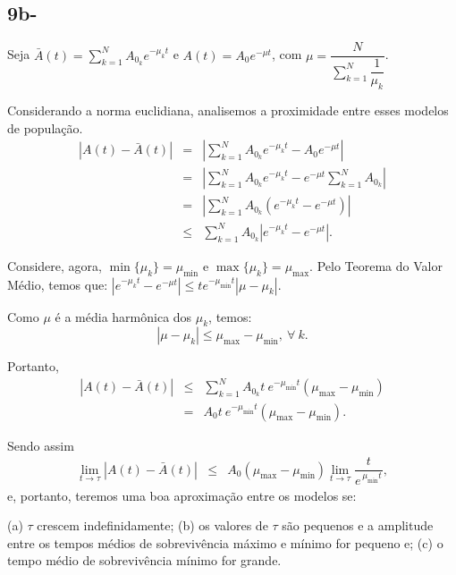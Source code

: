 {\subsection*{9b-}

Seja \(\bar{A}(t) = \displaystyle\sum_{k=1}^{N} A_{0_{k}} e^{-\mu_k t}\) e \(A(t) = A_{0} e^{-\mu t}\), com \(\mu = \dfrac{N}{\displaystyle\sum_{k=1}^{N} \dfrac{1}{\mu_k}}\).

Considerando a norma euclidiana, analisemos a proximidade entre esses modelos de população.
\[\begin{array}{rcl}
\left|A(t)-\bar{A}(t)\right|
&=& \left|\displaystyle\sum_{k=1}^{N} A_{0_{k}} e^{-\mu_k t}-A_{0} e^{-\mu t}\right| \\
&=& \left|\displaystyle\sum_{k=1}^{N} A_{0_{k}} e^{-\mu_k t}-e^{-\mu t} \sum_{k=1}^{N} A_{0_{k}} \right| \\
&=& \left|\displaystyle\sum_{k=1}^{N} A_{0_{k}} (e^{-\mu_k t}-e^{-\mu t}) \right| \\
&\le& \displaystyle\sum_{k=1}^{N} A_{0_{k}} \left|e^{-\mu_k t}-e^{-\mu t}\right|.
\end{array}\]

Considere, agora, \(\min\{\mu_k\} = \mu_{\min}\) e \(\max\{\mu_k\} = \mu_{\max}\). Pelo Teorema do Valor Médio, temos que:
\(\left|e^{-\mu_k t}-e^{-\mu t}\right| \le t e^{-\mu_{\min} t} |\mu -\mu_k|.\)

Como \(\mu\) é a média harmônica dos \(\mu_k\), temos:
\[
|\mu -\mu_k| \le \mu_{\max} - \mu_{\min},\ \forall\ k.
\]

Portanto,
\[\begin{array}{rcl}
\left|A(t)-\bar{A}(t)\right|
&\le& \displaystyle\sum_{k=1}^{N} A_{0_{k}} t\ e^{-\mu_{\min} t} (\mu_{\max} - \mu_{\min}) \\
&=& A_{0} t\ e^{-\mu_{\min} t} (\mu_{\max} - \mu_{\min}).
\end{array}\]

Sendo assim
\[\begin{array}{rcl}
\displaystyle\lim_{t\to \tau} \left|A(t)-\bar{A}(t)\right|
&\le& 
A_{0} (\mu_{\max} - \mu_{\min}) \displaystyle\lim_{t\to \tau} \dfrac{t}{e^{\, \mu_{\min} t}},
\end{array}\]
e, portanto, teremos uma boa aproximação entre os modelos se:

(a) \(\tau\) crescem indefinidamente;
(b) os valores de \(\tau\) são pequenos e a amplitude entre os tempos médios de sobrevivência máximo e mínimo for pequeno e; (c) o tempo médio de sobrevivência mínimo for grande.  


}
